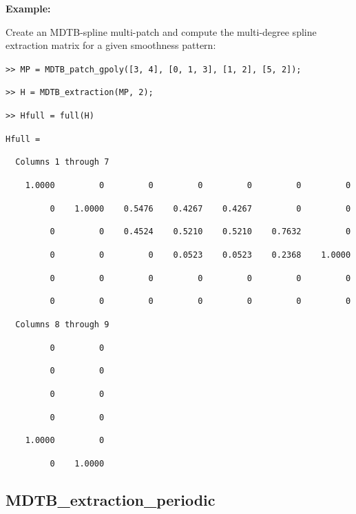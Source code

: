 \documentclass[10pt]{acmtrans2e}
\newenvironment{example}
{\vspace*{0.1cm}
\noindent \textbf{Example:} \vspace*{0.15cm}

\setlength{\parskip}{0.5ex plus 0.5exminus 0.2 ex}
}
{\medskip
}
\begin{document}
\begin{example}
\noindent Create an MDTB-spline multi-patch and compute the multi-degree spline extraction matrix for a given smoothness pattern:
\medskip

\texttt{>> MP = MDTB\_patch\_gpoly([3, 4], [0, 1, 3], [1, 2], [5, 2]);}

\texttt{>> H = MDTB\_extraction(MP, 2);}

\texttt{>> Hfull = full(H)}

\texttt{Hfull =}

\texttt{\ \ Columns 1 through 7}

\texttt{\ \ \ \ 1.0000\ \ \ \ \ \ \ \ \ 0\ \ \ \ \ \ \ \ \ 0\ \ \ \ \ \ \ \ \ 0\ \ \ \ \ \ \ \ \ 0\ \ \ \ \ \ \ \ \ 0\ \ \ \ \ \ \ \ \ 0}

\texttt{\ \ \ \ \ \ \ \ \ 0\ \ \ \ 1.0000\ \ \ \ 0.5476\ \ \ \ 0.4267\ \ \ \ 0.4267\ \ \ \ \ \ \ \ \ 0\ \ \ \ \ \ \ \ \ 0}

\texttt{\ \ \ \ \ \ \ \ \ 0\ \ \ \ \ \ \ \ \ 0\ \ \ \ 0.4524\ \ \ \ 0.5210\ \ \ \ 0.5210\ \ \ \ 0.7632\ \ \ \ \ \ \ \ \ 0}

\texttt{\ \ \ \ \ \ \ \ \ 0\ \ \ \ \ \ \ \ \ 0\ \ \ \ \ \ \ \ \ 0\ \ \ \ 0.0523\ \ \ \ 0.0523\ \ \ \ 0.2368\ \ \ \ 1.0000}

\texttt{\ \ \ \ \ \ \ \ \ 0\ \ \ \ \ \ \ \ \ 0\ \ \ \ \ \ \ \ \ 0\ \ \ \ \ \ \ \ \ 0\ \ \ \ \ \ \ \ \ 0\ \ \ \ \ \ \ \ \ 0\ \ \ \ \ \ \ \ \ 0}

\texttt{\ \ \ \ \ \ \ \ \ 0\ \ \ \ \ \ \ \ \ 0\ \ \ \ \ \ \ \ \ 0\ \ \ \ \ \ \ \ \ 0\ \ \ \ \ \ \ \ \ 0\ \ \ \ \ \ \ \ \ 0\ \ \ \ \ \ \ \ \ 0}

\texttt{\ \ Columns 8 through 9}

\texttt{\ \ \ \ \ \ \ \ \ 0\ \ \ \ \ \ \ \ \ 0}

\texttt{\ \ \ \ \ \ \ \ \ 0\ \ \ \ \ \ \ \ \ 0}

\texttt{\ \ \ \ \ \ \ \ \ 0\ \ \ \ \ \ \ \ \ 0}

\texttt{\ \ \ \ \ \ \ \ \ 0\ \ \ \ \ \ \ \ \ 0}

\texttt{\ \ \ \ 1.0000\ \ \ \ \ \ \ \ \ 0}

\texttt{\ \ \ \ \ \ \ \ \ 0\ \ \ \ 1.0000}
\end{example}


\subsection{MDTB\_extraction\_periodic} \label{sec:matlab-mdtb-extraction-periodic}
\end{document}
